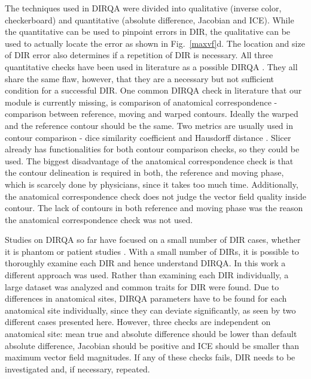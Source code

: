 The techniques used in DIRQA were divided into qualitative (inverse color, checkerboard) and quantitative (absolute difference, Jacobian and ICE). 
While the quantitative can be used to pinpoint errors in DIR, the qualitative
can be used to actually locate the error as shown in Fig.~\ref{maxvf}d. The location and size of DIR error also determines if a repetition of DIR is necessary.
All three quantitative checks have been used in literature as a possible DIRQA \cite{Varadhan2013, Leow2007, Christensen2001, Bender2009}.
They all share the same flaw, however, that they are a necessary but not sufficient condition for a successful DIR. 
One common DIRQA check in literature that our module is currently missing, is comparison of anatomical correspondence - 
comparison between reference, moving and warped contours. Ideally the warped and the reference contour should be the same. Two metrics are usually used in contour comparison -
dice similarity coefficient \cite{Varadhan2013} and Hausdorff distance \cite{Huttenlocher1993}. Slicer already has functionalities for both contour comparison checks, so they could be used. 
The biggest disadvantage of the anatomical correspondence check is that the contour delineation is required in both, the reference and moving phase, which is scarcely done by physicians, 
since it takes too much time. Additionally, the anatomical correspondence check does not judge the vector field quality inside contour.
The lack of contours in both reference and moving phase was the reason the anatomical correspondence check was not used.

Studies on DIRQA so far have focused on a small number of DIR cases, whether it is phantom \cite{Mutic2001,Moore2004} or patient studies \cite{Wu2008, Varadhan2013}. With a small number of DIRs,
it is possible to thoroughly examine each DIR and hence understand DIRQA. In this work a different approach was
used. Rather than examining each DIR individually, a large dataset was analyzed and common traits for DIR were found. Due to differences in anatomical sites, 
DIRQA parameters have to be found for each anatomical site individually, since they can
deviate significantly, as seen by two different cases presented here. However, three checks are independent on anatomical site: mean true and absolute difference should be lower than 
default absolute difference, Jacobian should be positive and ICE should be smaller than maximum vector field magnitudes. 
If any of these checks fails, DIR needs to be investigated and, if necessary, repeated.

